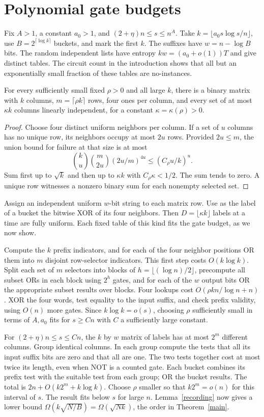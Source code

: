 \documentclass[11pt]{article}
\begin{document}
\section{Polynomial gate budgets}\label{poly}
Fix $A>1$, a constant $a_0>1$, and $(2+\eta)n\le s\le n^A$. Take $k=\lfloor a_0s\log s/n\rfloor$, use $B=2^{\lceil\log k\rceil}$ buckets, and mark the first $k$. The suffixes have $w=n-\log B$ bits. The random independent lists have entropy $kw=(a_0+o(1))T$ and give distinct tables. The circuit count in the introduction shows that all but an exponentially small fraction of these tables are no-instances.
\begin{lemma}\label{ldpc}
For every sufficiently small fixed $\rho>0$ and all large $k$, there is a binary matrix with $k$ columns, $m=\lceil\rho k\rceil$ rows, four ones per column, and every set of at most $\kappa k$ columns linearly independent, for a constant $\kappa=\kappa(\rho)>0$.
\end{lemma}
\begin{proof}
Choose four distinct uniform neighbors per column. If a set of $u$ columns has no unique row, its neighbors occupy at most $2u$ rows. Provided $2u\le m$, the union bound for failure at that size is at most
\[
 \binom ku\binom m{2u}(2u/m)^{4u}\le(C_\rho u/k)^u.
\]
Sum first up to $\sqrt k$ and then up to $\kappa k$ with $C_\rho\kappa<1/2$. The sum tends to zero. A unique row witnesses a nonzero binary sum for each nonempty selected set.
\end{proof}
Assign an independent uniform $w$-bit string to each matrix row. Use as the label of a bucket the bitwise XOR of its four neighbors. Then $D=\lfloor\kappa k\rfloor$ labels at a time are fully uniform. Each fixed table of this kind fits the gate budget, as we now show.

Compute the $k$ prefix indicators, and for each of the four neighbor positions OR them into $m$ disjoint row-selector indicators. This first step costs $O(k\log k)$. Split each set of $m$ selectors into blocks of $h=\lfloor(\log n)/2\rfloor$, precompute all subset ORs in each block using $2^h$ gates, and for each of the $w$ output bits OR the appropriate subset results over blocks. Four lookups cost $O(\rho k n/\log n+n)$. XOR the four words, test equality to the input suffix, and check prefix validity, using $O(n)$ more gates. Since $k\log k=o(s)$, choosing $\rho$ sufficiently small in terms of $A,a_0$ fits for $s\ge Cn$ with $C$ a sufficiently large constant.

For $(2+\eta)n\le s\le Cn$, the $k$ by $w$ matrix of labels has at most $2^m$ different columns. Group identical columns. In each group compute the tests that all its input suffix bits are zero and that all are one. The two tests together cost at most twice its length, even when NOT is a counted gate. Each bucket combines its prefix test with the suitable test from each group; OR the bucket results. The total is $2n+O(k2^m+k\log k)$. Choose $\rho$ smaller so that $k2^m=o(n)$ for this interval of $s$. The result fits below $s$ for large $n$. Lemma~\ref{recording} now gives a lower bound $\Omega(k\sqrt{N/B})=\Omega(\sqrt{Nk})$, the order in Theorem~\ref{main}.
\end{document}

